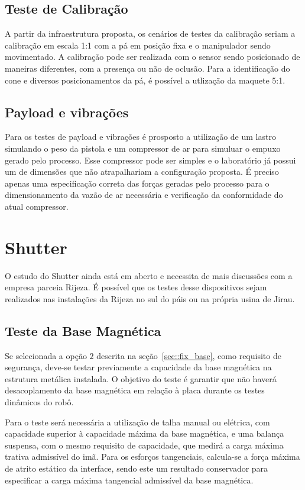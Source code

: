 \subsection{Teste de Calibração}

A partir da infraestrutura proposta, os cenários de testes da calibração seriam
a calibração em escala 1:1 com a pá em posição fixa e o manipulador sendo
movimentado. A calibração pode ser realizada com o sensor sendo posicionado de
maneiras diferentes, com a presença ou não de oclusão. Para a identificação do
cone e diversos posicionamentos da pá, é possível a utlização da maquete 5:1.

\subsection{Payload e vibrações}

Para os testes de payload e vibrações é prosposto a utilização de um lastro
simulando o peso da pistola e um compressor de ar para simuluar o empuxo gerado
pelo processo. Esse compressor pode ser simples e o laboratório já possui um de
dimensões que não atrapalhariam a configuração proposta. É preciso apenas uma
especificação correta das forças geradas pelo processo para o dimensionamento da
vazão de ar necessária e verificação da conformidade do atual compressor.

\section{Shutter}

O estudo do Shutter ainda está em aberto e necessita de mais discussões com a
empresa parceia Rijeza. É possível que os testes desse dispositivos sejam
realizados nas instalações da Rijeza no sul do páis ou na própria usina de
Jirau.

\subsection{Teste da Base Magnética}
 
 Se selecionada a opção $2$ descrita na seção~\ref{sec::fix_base}, como
 requisito de segurança, deve-se testar previamente a capacidade da base
 magnética na estrutura metálica instalada.
 O objetivo do teste é garantir que não haverá desacoplamento da base magnética
 em relação à placa durante os testes dinâmicos do robô.
 
 Para o teste será necessária a utilização de talha manual ou elétrica, com
 capacidade superior à capacidade máxima da base magnética, e uma balança
 suspensa, com o mesmo requisito de capacidade, que medirá a carga máxima
 trativa admissível do imã. 
 Para os esforços tangenciais, calcula-se a força máxima de atrito estático da
 interface, sendo este um resultado conservador para especificar a carga máxima
 tangencial admissível da base magnética.
